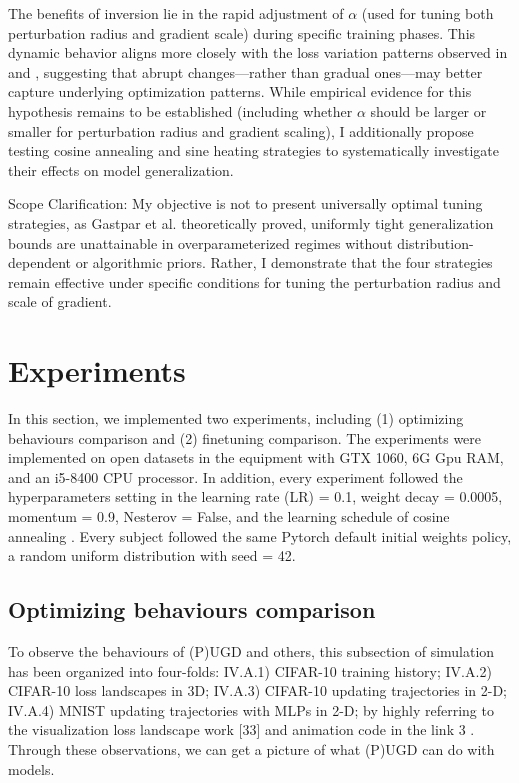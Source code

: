 \documentclass[10pt,twocolumn,letterpaper]{article}
\begin{document}
The benefits of inversion lie in the rapid adjustment of $\alpha$ (used for tuning both perturbation radius and gradient scale) during specific training phases. This dynamic behavior aligns more closely with the loss variation patterns observed in  and , suggesting that abrupt changes—rather than gradual ones—may better capture underlying optimization patterns. While empirical evidence for this hypothesis remains to be established (including whether $\alpha$ should be larger or smaller for perturbation radius and gradient scaling), I additionally propose testing cosine annealing and sine heating strategies to systematically investigate their effects on model generalization.

Scope Clarification: My objective is not to present universally optimal tuning strategies, as Gastpar et al. \cite{gastpar2023fantasticgeneralizationmeasures} theoretically proved, uniformly tight generalization bounds are unattainable in overparameterized regimes without distribution-dependent or algorithmic priors. Rather, I demonstrate that the four strategies remain effective under specific conditions for tuning the perturbation radius and scale of gradient.


\section{Experiments}
\label{sec:4}

In this section, we implemented two experiments, including (1) optimizing behaviours comparison and (2) finetuning comparison. The experiments were implemented on open datasets in the equipment with GTX 1060, 6G Gpu RAM, and an i5-8400 CPU processor. In addition, every experiment followed the hyperparameters setting in the learning rate (LR)	= 0.1, weight decay = 0.0005, momentum = 0.9, Nesterov = False, and the learning schedule of cosine annealing \cite{loshchilov2017sgdrstochasticgradientdescent}. Every subject followed the same Pytorch 
default initial weights policy, a random uniform distribution with seed = 42. 

\subsection{Optimizing behaviours comparison}
\label{subsec:4.1}

To observe the behaviours of (P)UGD and others, this 
subsection of simulation has been organized into four-folds:  
IV.A.1) CIFAR-10 training history; IV.A.2) CIFAR-10 loss 
landscapes in 3D; IV.A.3) CIFAR-10 updating trajectories in 
2-D; IV.A.4) MNIST updating trajectories with MLPs in 2-D; 
by highly referring to the visualization loss landscape work 
[33]  and animation code in the link 3 . Through these 
observations, we can get a picture of what (P)UGD can do 
with models. 
\end{document}
